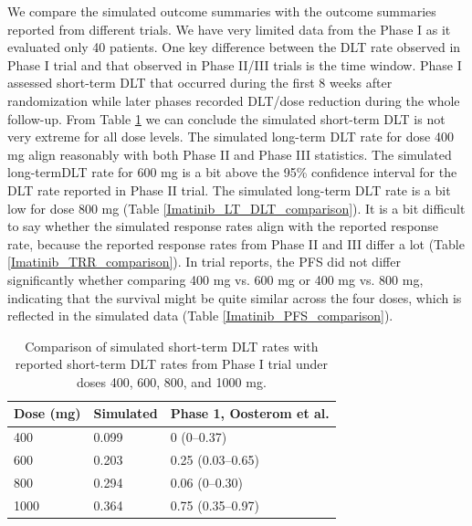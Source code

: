 \documentclass[11pt]{article}
\begin{document}
We compare the simulated outcome summaries with the outcome summaries reported from different trials. We have very limited data from the Phase I as it evaluated only 40 patients. One key difference between the DLT rate observed in Phase I trial and that observed in Phase II/III trials is the time window. Phase I assessed short-term DLT that occurred during the first 8 weeks after randomization while later phases recorded DLT/dose reduction during the whole follow-up. From Table \ref{Imatinib_ST_DLT_comparison} we can conclude the simulated short-term DLT is not very extreme for all dose levels. The simulated long-term DLT rate for dose 400 mg align reasonably with both Phase II and Phase III statistics. The simulated long-termDLT rate for 600 mg is a bit above the 95\% confidence interval for the DLT rate reported in Phase II trial. The simulated long-term DLT rate is a bit low for dose 800 mg (Table \ref{Imatinib_LT_DLT_comparison}). It is a bit difficult to say whether the simulated response rates align with the reported response rate, because the reported response rates from Phase II and III differ a lot (Table \ref{Imatinib_TRR_comparison}). In trial reports, the PFS did not differ significantly whether comparing 400 mg vs. 600 mg or 400 mg vs. 800 mg, indicating that the survival might be quite similar across the four doses, which is reflected in the simulated data (Table \ref{Imatinib_PFS_comparison}).

\begin{table}[htbp]
\centering
\caption{Comparison of simulated short-term DLT rates with reported short-term DLT rates from Phase I trial under doses 400, 600, 800, and 1000 mg.}
\label{Imatinib_ST_DLT_comparison}
\begin{tabular}{lll}
\toprule
\textbf{Dose (mg)} & \textbf{Simulated} & \textbf{Phase 1, Oosterom et al.} \\
\midrule
400  & 0.099 & 0 (0--0.37) \\
600  & 0.203 & 0.25 (0.03--0.65) \\
800  & 0.294 & 0.06 (0--0.30) \\
1000 & 0.364 & 0.75 (0.35--0.97) \\
\bottomrule
\end{tabular}
\end{table}
\end{document}
